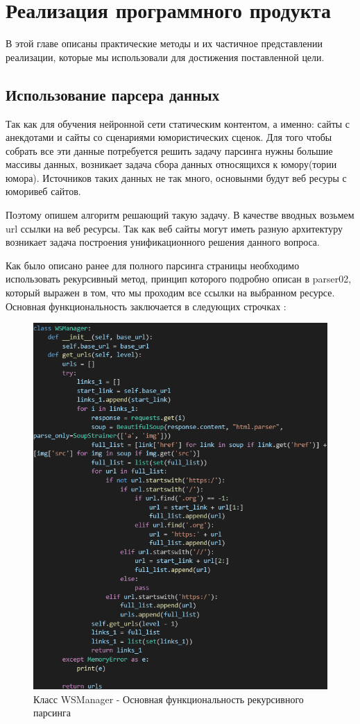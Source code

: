 \chapter{Реализация программного продукта}

В этой главе описаны практические методы и их частичное представлении реализации, 
которые мы использовали для достижения поставленной цели.

\section{Использование парсера данных}

Так как для обучения нейронной сети статическим контентом, а именно: сайты с анекдотами и сайты со сценариями юмористических сценок. 
Для того чтобы собрать все эти данные потребуется решить задачу парсинга нужны большие массивы данных, возникает задача сбора данных 
относящихся к юмору(тории юмора). Источников таких данных не так много, основынми будут веб ресуры с юморивеб сайтов.

Поэтому опишем алгоритм решающий такую задачу. В качестве вводных возьмем url ссылки на веб ресурсы. 
Так как веб сайты могут иметь разную архитектуру возникает задача построения унификационного решения данного вопроса.

Как было описано ранее для полного парсинга страницы необходимо использовать рекурсивный метод, принцип которого подробно описан в parser02, 
который выражен в том, что мы проходим все ссылки на выбранном ресурсе. Основная функциональность заключается в следующих строчках :

\begin{figure}[H]
\includegraphics[width=0.75\columnwidth]{./img/code_block_1.png}
\centering
\caption{Класс WSManager - Основная функциональность рекурсивного парсинга}
\label{pic:code_block_1.png}
\end{figure}


